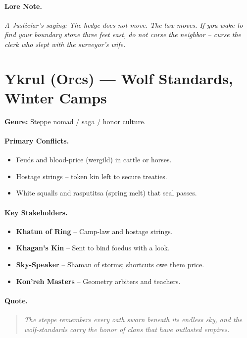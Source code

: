 \paragraph{Lore Note.}
\emph{A Justiciar's saying: \textquotedbl The hedge does not move. The law moves. If you wake to find your boundary stone three feet east, do not curse the neighbor -- curse the clerk who slept with the surveyor's wife.\textquotedbl}

\section{Ykrul (Orcs) --- \textquotedbl Wolf Standards, Winter Camps\textquotedbl}
\textbf{Genre:} Steppe nomad / saga / honor culture.

\paragraph{Primary Conflicts.}
\begin{itemize}
  \item Feuds and blood-price (wergild) in cattle or horses.
  \item Hostage strings -- token kin left to secure treaties.
  \item White squalls and rasputitsa (spring melt) that seal passes.
\end{itemize}

\paragraph{Key Stakeholders.}
\begin{itemize}
  \item \textbf{Khatun of Ring} -- Camp-law and hostage strings.
  \item \textbf{Khagan's Kin} -- Sent to bind foedus with a look.
  \item \textbf{Sky-Speaker} -- Shaman of storms; shortcuts owe them price.
  \item \textbf{Kon'reh Masters} -- Geometry arbiters and teachers.
\end{itemize}

\paragraph{Quote.}
\begin{quote}
\emph{\textquotedbl The steppe remembers every oath sworn beneath its endless sky, and the wolf-standards carry the honor of clans that have outlasted empires.\textquotedbl}
\end{quote}

